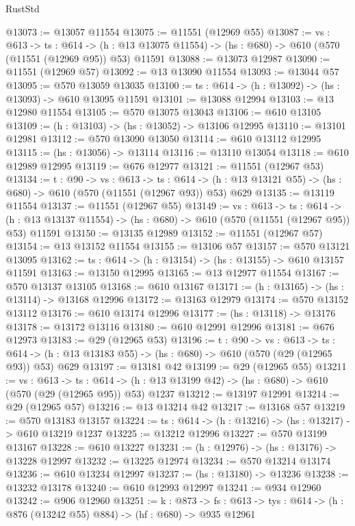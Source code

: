 \begin{lexlean}{RustStd}
\begin{coremodule}
@13073 := @13057 @11554
@13075 := @11551 (@12969 @55)
@13087 := {vs : @613} ->
  {ts : @614} ->
  (h : @13 @13075 @11554) -> (hs : @680) -> @610 (@570 (@11551 (@12969 @95)) @53) @11591
@13088 := @13073 @12987
@13090 := @11551 (@12969 @57)
@13092 := @13 @13090 @11554
@13093 := @13044 @57
@13095 := @570 @13059 @13035
@13100 := {ts : @614} -> (h : @13092) -> (hs : @13093) -> @610 @13095 @11591
@13101 := @13088 @12994
@13103 := @13 @12980 @11554
@13105 := @570 @13075 @13043
@13106 := @610 @13105
@13109 := (h : @13103) -> (hs : @13052) -> @13106 @12995
@13110 := @13101 @12981
@13112 := @570 @13090 @13050
@13114 := @610 @13112 @12995
@13115 := (hs : @13056) -> @13114
@13116 := @13110 @13054
@13118 := @610 @12989 @12995
@13119 := @676 @12977
@13121 := @11551 (@12967 @53)
@13134 := {t : @90} ->
  {vs : @613} ->
  {ts : @614} -> (h : @13 @13121 @55) -> (hs : @680) -> @610 (@570 (@11551 (@12967 @93)) @53) @629
@13135 := @13119 @11554
@13137 := @11551 (@12967 @55)
@13149 := {vs : @613} ->
  {ts : @614} ->
  (h : @13 @13137 @11554) -> (hs : @680) -> @610 (@570 (@11551 (@12967 @95)) @53) @11591
@13150 := @13135 @12989
@13152 := @11551 (@12967 @57)
@13154 := @13 @13152 @11554
@13155 := @13106 @57
@13157 := @570 @13121 @13095
@13162 := {ts : @614} -> (h : @13154) -> (hs : @13155) -> @610 @13157 @11591
@13163 := @13150 @12995
@13165 := @13 @12977 @11554
@13167 := @570 @13137 @13105
@13168 := @610 @13167
@13171 := (h : @13165) -> (hs : @13114) -> @13168 @12996
@13172 := @13163 @12979
@13174 := @570 @13152 @13112
@13176 := @610 @13174 @12996
@13177 := (hs : @13118) -> @13176
@13178 := @13172 @13116
@13180 := @610 @12991 @12996
@13181 := @676 @12973
@13183 := @29 (@12965 @53)
@13196 := {t : @90} ->
  {vs : @613} ->
  {ts : @614} -> (h : @13 @13183 @55) -> (hs : @680) -> @610 (@570 (@29 (@12965 @93)) @53) @629
@13197 := @13181 @42
@13199 := @29 (@12965 @55)
@13211 := {vs : @613} ->
  {ts : @614} -> (h : @13 @13199 @42) -> (hs : @680) -> @610 (@570 (@29 (@12965 @95)) @53) @1237
@13212 := @13197 @12991
@13214 := @29 (@12965 @57)
@13216 := @13 @13214 @42
@13217 := @13168 @57
@13219 := @570 @13183 @13157
@13224 := {ts : @614} -> (h : @13216) -> (hs : @13217) -> @610 @13219 @1237
@13225 := @13212 @12996
@13227 := @570 @13199 @13167
@13228 := @610 @13227
@13231 := (h : @12976) -> (hs : @13176) -> @13228 @12997
@13232 := @13225 @12974
@13234 := @570 @13214 @13174
@13236 := @610 @13234 @12997
@13237 := (hs : @13180) -> @13236
@13238 := @13232 @13178
@13240 := @610 @12993 @12997
@13241 := @934 @12960
@13242 := @906 @12960
@13251 := {k : @873} ->
  {fs : @613} -> {tys : @614} -> (h : @876 (@13242 @55) @884) -> (hf : @680) -> @935 @12961

\end{coremodule}
\end{lexlean}
